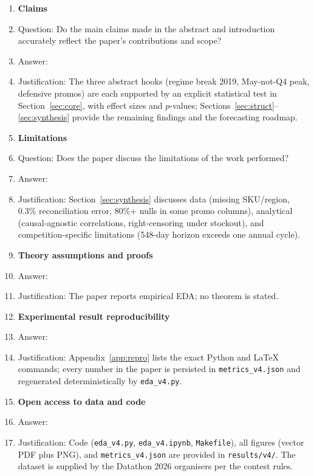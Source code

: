 \documentclass{article}
\begin{document}
\begin{enumerate}

\item {\bf Claims}
    \item[] Question: Do the main claims made in the abstract and introduction accurately reflect the paper's contributions and scope?
    \item[] Answer: \answerYes{}
    \item[] Justification: The three abstract hooks (regime break 2019, May-not-Q4 peak, defensive promos) are each supported by an explicit statistical test in Section~\ref{sec:core}, with effect sizes and $p$-values; Sections~\ref{sec:struct}--\ref{sec:synthesis} provide the remaining findings and the forecasting roadmap.

\item {\bf Limitations}
    \item[] Question: Does the paper discuss the limitations of the work performed?
    \item[] Answer: \answerYes{}
    \item[] Justification: Section~\ref{sec:synthesis} discusses data (missing SKU/region, 0.3\% reconciliation error, 80\%+ nulls in some promo columns), analytical (causal-agnostic correlations, right-censoring under stockout), and competition-specific limitations (548-day horizon exceeds one annual cycle).

\item {\bf Theory assumptions and proofs}
    \item[] Answer: \answerNA{}
    \item[] Justification: The paper reports empirical EDA; no theorem is stated.

\item {\bf Experimental result reproducibility}
    \item[] Answer: \answerYes{}
    \item[] Justification: Appendix~\ref{app:repro} lists the exact Python and LaTeX commands; every number in the paper is persisted in \texttt{metrics\_v4.json} and regenerated deterministically by \texttt{eda\_v4.py}.

\item {\bf Open access to data and code}
    \item[] Answer: \answerYes{}
    \item[] Justification: Code (\texttt{eda\_v4.py}, \texttt{eda\_v4.ipynb}, \texttt{Makefile}), all figures (vector PDF plus PNG), and \texttt{metrics\_v4.json} are provided in \texttt{results/v4/}. The dataset is supplied by the Datathon 2026 organisers per the contest rules.


\end{enumerate}
\end{document}
